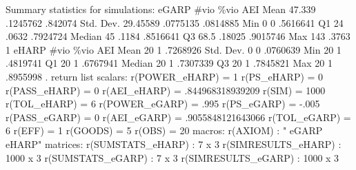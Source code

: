 Summary statistics for simulations:
{\smallskip}
       eGARP {\VBAR}      \#vio       \%vio        AEI 
        Mean {\VBAR}    47.339   .1245762    .842074 
   Std. Dev. {\VBAR}  29.45589   .0775135   .0814885 
         Min {\VBAR}         0          0   .5616641 
          Q1 {\VBAR}        24      .0632   .7924724 
      Median {\VBAR}        45      .1184   .8516641 
          Q3 {\VBAR}      68.5     .18025   .9015746 
         Max {\VBAR}       143      .3763          1 
{\smallskip}
       eHARP {\VBAR}      \#vio       \%vio        AEI 
        Mean {\VBAR}        20          1   .7268926 
   Std. Dev. {\VBAR}         0          0   .0760639 
         Min {\VBAR}        20          1   .4819741 
          Q1 {\VBAR}        20          1   .6767941 
      Median {\VBAR}        20          1   .7307339 
          Q3 {\VBAR}        20          1   .7845821 
         Max {\VBAR}        20          1   .8955998 
. return list
{\smallskip}
scalars:
        r(POWER_eHARP) =  1
           r(PS_eHARP) =  0
         r(PASS_eHARP) =  0
          r(AEI_eHARP) =  .844968318939209
                r(SIM) =  1000
          r(TOL_eHARP) =  6
        r(POWER_eGARP) =  .995
           r(PS_eGARP) =  -.005
         r(PASS_eGARP) =  0
          r(AEI_eGARP) =  .9055848121643066
          r(TOL_eGARP) =  6
                r(EFF) =  1
              r(GOODS) =  5
                r(OBS) =  20
{\smallskip}
macros:
              r(AXIOM) : " eGARP eHARP"
{\smallskip}
matrices:
     r(SUMSTATS_eHARP) :  7 x 3
   r(SIMRESULTS_eHARP) :  1000 x 3
     r(SUMSTATS_eGARP) :  7 x 3
   r(SIMRESULTS_eGARP) :  1000 x 3
